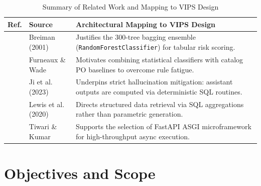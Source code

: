 \documentclass[conference]{IEEEtran}
\begin{document}
\begin{table}[t]
\centering
\caption{Summary of Related Work and Mapping to VIPS Design}
\label{tab:related_work}
\begin{tabular}{p{}p{}p{}}
\toprule
\textbf{Ref.} & \textbf{Source} & \textbf{Architectural Mapping to VIPS Design} \\
\midrule
\cite{breiman} & Breiman (2001) & Justifies the 300-tree bagging ensemble (\texttt{RandomForestClassifier}) for tabular risk scoring. \\
\cite{furneaux} & Furneaux \& Wade & Motivates combining statistical classifiers with catalog PO baselines to overcome rule fatigue. \\
\cite{ji_hallucination} & Ji et al. (2023) & Underpins strict hallucination mitigation: assistant outputs are computed via deterministic SQL routines. \\
\cite{lewis_rag} & Lewis et al. (2020) & Directs structured data retrieval via SQL aggregations rather than parametric generation. \\
\cite{tiwari} & Tiwari \& Kumar & Supports the selection of FastAPI ASGI microframework for high-throughput async execution. \\
\bottomrule
\end{tabular}
\end{table}

\section{Objectives and Scope}
\end{document}
